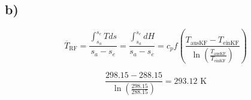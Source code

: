 

\subsection*{b)}
\[
\overline{T}_{\text{RF}} = \frac{\int_{s_a}^{s_e} T ds}{s_a - s_e} = \frac{\int_{s_a}^{s_e} dH}{s_a - s_e} = c_p f \left( \frac{T_{\text{ausKF}} - T_{\text{einKF}}}{\ln \left( \frac{T_{\text{ausKF}}}{T_{\text{einKF}}} \right)} \right)
\]

\[
\frac{298.15 - 288.15}{\ln \left( \frac{298.15}{288.15} \right)} = 293.12 \text{ K}
\]